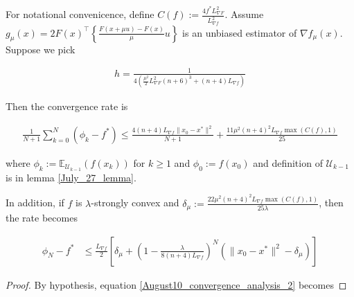 \documentclass{article}
\begin{document}
\begin{theorem} \label{August10_Theorem_ConvergenceAnalysis}
For notational convenicence, define $C(f):= \frac{4f^*L_{\nabla F}^2}{L_{\nabla f}^2}$. Assume $g_{\mu}(x) = 2F(x)^\top \left\{\frac{F(x+\mu u)-F(x)}{\mu}u\right\}$ is an unbiased estimator of $\nabla f_{\mu}(x)$. Suppose we pick 

\begin{align*}
h = \frac{1}{4\left(\frac{\mu^2}{2}L_{\nabla F}^2(n+6)^3 + (n+4)L_{\nabla f}\right)}
\end{align*}

Then the convergence rate is  

\begin{align}
\frac{1}{N+1}\sum_{k=0}^{N}(\phi_k-f^*) \leq \frac{4(n+4)L_{\nabla f}\|x_0 - x^*\|^2}{N+1} + \frac{11\mu^2(n+4)^2L_{\nabla f}\max(C(f),1)}{25} \label{August10_convergence_analysis_3}
\end{align}

where $\phi_k:= \mathbb{E}_{\mathcal{U}_{k-1}}(f(x_k))$ for $k \geq 1$ and $\phi_0:= f(x_0)$ and definition of $\mathcal{U}_{k-1}$ is in lemma \ref{July_27_lemma}. \newline 

In addition, if $f$ is $\lambda$-strongly convex and $\delta_{\mu}:= \frac{22\mu^2(n+4)^2L_{\nabla f}\max(C(f),1)}{25\lambda }$, then the rate becomes

\begin{align}
\phi_N - f^* & \leq \frac{L_{\nabla f}}{2}\left[\delta_{\mu} + \left(1 - \frac{\lambda}{8(n+4)L_{\nabla f}}\right)^N(\|x_0 - x^*\|^2 - \delta_{\mu})\right]
\end{align}

\begin{proof}
By hypothesis, equation \eqref{August10_convergence_analysis_2} becomes 


\end{proof}
\end{theorem}
\end{document}
